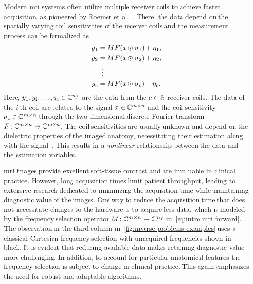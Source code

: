 Modern \gls{mri} systems often utilize multiple receiver coils to achieve faster acquisition, as pioneered by Roemer et al.~\cite{Roemer1990}.
There, the data depend on the spatially varying coil sensitivities of the receiver coils and the measurement process can be formalized as
\begin{equation}
	\begin{aligned}
		\Data_{\num{1}} &= \Mask \Fourier (\Signal \odot \CoilSensitivity_{\num{1}}) + \Noise_{\num{1}}, \\
		\Data_{\num{2}} &= \Mask \Fourier (\Signal \odot \CoilSensitivity_{\num{2}}) + \Noise_{\num{2}}, \\
				&\vdotswithin{=}\\
		\Data_\NumCoils &= \Mask \Fourier (\Signal \odot \CoilSensitivity_\NumCoils) + \Noise_\NumCoils. \\
	\end{aligned}
	\label{eq:intro mri forward}
\end{equation}
Here, \( y_{\num{1}}, y_{\num{2}}, \dotsc, y_c \in \mathbb{C}^{n_f} \) are the data from the \( c \in \mathbb{N} \) receiver coils.
The data of the \( i \)-th coil are related to the signal \( x \in \mathbb{C}^{m \times n} \) and the coil sensitivity \( \sigma_i \in \mathbb{C}^{m \times n} \) through the two-dimensional discrete Fourier transform \( F \colon \mathbb{C}^{m \times n} \to \mathbb{C}^{m \times n} \).
The coil sensitivities are usually unknown and depend on the dielectric properties of the imaged anatomy, necessitating their estimation along with the signal~\cite{Knoll2011}.
This results in a \emph{nonlinear} relationship between the data and the estimation variables.

\Gls{mri} images provide excellent soft-tissue contrast and are invaluable in clinical practice.
However, long acquisition times limit patient throughput, leading to extensive research dedicated to minimizing the acquisition time while maintaining diagnostic value of the images.
One way to reduce the acquisition time that does not necessitate changes to the hardware is to acquire less data, which is modeled by the frequency selection operator \( M \colon \mathbb{C}^{m \times n} \to \mathbb{C}^{n_f} \) in~\cref{eq:intro mri forward}.
The observation in the third column in~\cref{fig:inverse problems examples} uses a classical Cartesian frequency selection with unacquired frequencies shown in black.
It is evident that reducing available data makes retaining diagnostic value more challenging.
In addition, to account for particular anatomical features the frequency selection is subject to change in clinical practice.
This again emphasizes the need for robust and adaptable algorithms.

